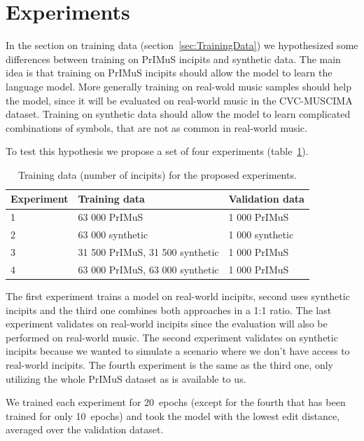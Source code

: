 \section{Experiments}

In the section on training data (section~\ref{sec:TrainingData}) we hypothesized some differences between training on PrIMuS incipits and synthetic data. The main idea is that training on PrIMuS incipits should allow the model to learn the language model. More generally training on real-wold music samples should help the model, since it will be evaluated on real-world music in the CVC-MUSCIMA dataset. Training on synthetic data should allow the model to learn complicated combinations of symbols, that are not as common in real-world music.

To test this hypothesis we propose a set of four experiments (table~\ref{tab6:ExperimentData}).

\begin{table}[h] \centering
\begin{tabular}{lll}
\toprule
\textbf{Experiment} & \textbf{Training data} & \textbf{Validation data} \\
\midrule
1 & 63 000 PrIMuS                   & 1 000 PrIMuS    \\
2 & 63 000 synthetic                & 1 000 synthetic \\
3 & 31 500 PrIMuS, 31 500 synthetic & 1 000 PrIMuS    \\
4 & 63 000 PrIMuS, 63 000 synthetic & 1 000 PrIMuS    \\
\bottomrule
\end{tabular}
\caption{Training data (number of incipits) for the proposed experiments.}
\label{tab6:ExperimentData}
\end{table}

The first experiment trains a model on real-world incipits, second uses synthetic incipits and the third one combines both approaches in a 1:1 ratio. The last experiment validates on real-world incipits since the evaluation will also be performed on real-world music. The second experiment validates on synthetic incipits because we wanted to simulate a scenario where we don't have access to real-world incipits. The fourth experiment is the same as the third one, only utilizing the whole PrIMuS dataset as is available to us.

We trained each experiment for 20~epochs (except for the fourth that has been trained for only 10~epochs) and took the model with the lowest edit distance, averaged over the validation dataset.

